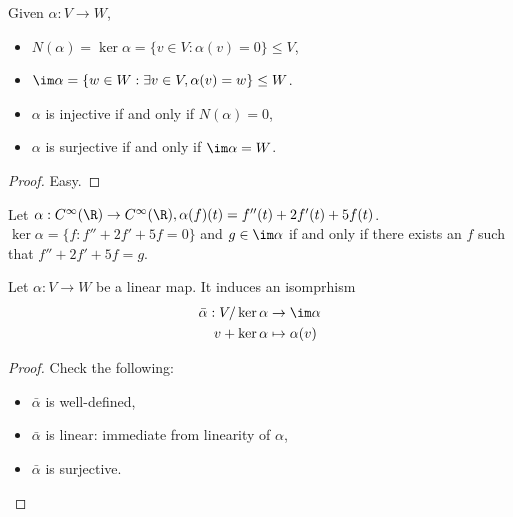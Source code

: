 \documentclass[a4paper]{article}
\theoremstyle{definition}
\begin{document}
\begin{definition}
  Given \(\alpha: V\to W\),
  \begin{itemize}
  \item \(N(\alpha) = \ker \alpha = \{v\in V: \alpha(v) = 0\} \leq V\),
  \item \(\im \alpha = \{w\in W: \exists v\in V, \alpha(v) = w \} \leq W\).
  \end{itemize}
\end{definition}

\begin{proposition}\leavevmode
  \begin{itemize}
  \item \(\alpha\) is injective if and only if \(N(\alpha) = 0\),
  \item \(\alpha\) is surjective if and only if \(\im \alpha = W\).
  \end{itemize}
\end{proposition}

\begin{proof}
  Easy.
\end{proof}

\begin{eg}
  Let \(\alpha: C^\infty(\R) \to C^\infty(\R), \alpha(f)(t) = f''(t)+2f'(t)+5f(t)\). \(\ker \alpha = \{f:f''+2f'+5f=0\}\) and \(g\in \im \alpha\) if and only if there exists an \(f\) such that \(f''+2f'+5f=g\).
\end{eg}

\begin{theorem}
  Let \(\alpha: V\to W\) be a linear map. It induces an isomprhism
  \begin{align*}
    \bar \alpha: V/\ker \alpha &\to \im \alpha \\
    v + \ker \alpha &\mapsto \alpha(v)
  \end{align*}
\end{theorem}

\begin{proof}
  Check the following:
  \begin{itemize}
  \item \(\bar \alpha\) is well-defined,
  \item \(\bar \alpha\) is linear: immediate from linearity of \(\alpha\),
  \item \(\bar \alpha\) is surjective.
  \end{itemize}
\end{proof}
\end{document}

